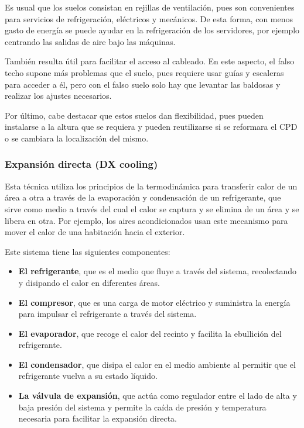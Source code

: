 Es usual que los suelos consistan en rejillas de ventilación, pues son convenientes para servicios de refrigeración, eléctricos y mecánicos. De esta forma, con menos gasto de energía se puede ayudar en la refrigeración de los servidores, por ejemplo centrando las salidas de aire bajo las máquinas.

También resulta útil para facilitar el acceso al cableado. En este aspecto, el falso techo supone más problemas que el suelo, pues requiere usar guías y escaleras para acceder a él, pero con el falso suelo solo hay que levantar las baldosas y realizar los ajustes necesarios.

Por último, cabe destacar que estos suelos dan flexibilidad, pues pueden instalarse a la altura que se requiera y pueden reutilizarse si se reformara el CPD o se cambiara la localización del mismo.

\subsubsection{Expansión directa (DX cooling)}

Esta técnica utiliza los principios de la termodinámica para transferir calor de un área a otra a través de la evaporación y condensación de un refrigerante, que sirve como medio a través del cual el calor se captura y se elimina de un área y se libera en otra. Por ejemplo, los aires acondicionados usan este mecanismo para mover el calor de una habitación hacia el exterior.

Este sistema tiene las siguientes componentes:

\begin{itemize}
    \item {\textbf{El refrigerante}}, que es el medio que fluye a través del sistema, recolectando y disipando el calor en diferentes áreas.
    \item \textbf{El compresor}, que es una carga de motor eléctrico y suministra la energía para impulsar el refrigerante a través del sistema.
    \item \textbf{El evaporador}, que recoge el calor del recinto y facilita la ebullición del refrigerante.
    \item \textbf{El condensador}, que disipa el calor en el medio ambiente al permitir que el refrigerante vuelva a su estado líquido.
    \item \textbf{La válvula de expansión}, que actúa como regulador entre el lado de alta y baja presión del sistema y permite la caída de presión y temperatura necesaria para facilitar la expansión directa.
\end{itemize}


